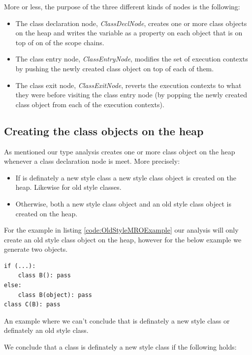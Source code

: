 More or less, the purpose of the three different kinds of nodes is the following:

\begin{itemize}
	\item The class declaration node, \textit{ClassDeclNode}, creates one or more class objects on the heap and writes the variable  as a property on each object that is on top of on of the scope chains.
	\item The class entry node, \textit{ClassEntryNode}, modifies the set of execution contexts by pushing the newly created class object on top of each of them.
	\item The class exit node, \textit{ClassExitNode}, reverts the execution contexts to what they were before visiting the class entry node (by popping the newly created class object from each of the execution contexts).
\end{itemize}

\subsection{Creating the class objects on the heap}
As mentioned our type analysis creates one or more class object on the heap whenever a class declaration node is meet. More precisely:

\begin{itemize}
	\item If  is definately a new style class a new style class object is created on the heap. Likewise for old style classes.
	\item Otherwise, both a new style class object and an old style class object is created on the heap.
\end{itemize}

For the example in listing \ref{code:OldStyleMROExample} our analysis will only create an old style class object on the heap, however for the below example we generate two objects.

\begin{listing}[H]
	\begin{verbatim}
if (...):
	class B(): pass
else:
	class B(object): pass
class C(B): pass
	\end{verbatim}
	\caption{An example where we can't conclude that  is definately a new style class or definately an old style class.}\label{code:NotDefinatelyNewOldStyleClass}
\end{listing}

We conclude that a class is definately a new style class if the following holds:

